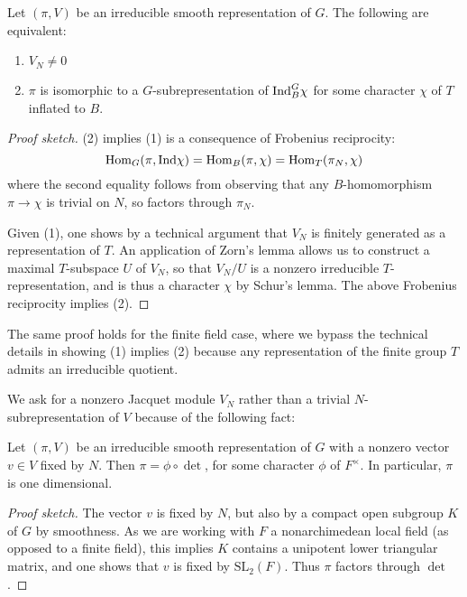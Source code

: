 \begin{prop}
    Let $(\pi,V)$ be an irreducible smooth representation of $G$. The following are equivalent:
    \begin{enumerate}
        \item $V_N \neq 0$
        \item $\pi$ is isomorphic to a $G$-subrepresentation of $\mathrm{Ind}_B^G \chi$ for some character $\chi$ of $T$ inflated to $B$.
    \end{enumerate}
\end{prop}
\begin{proof}[Proof sketch]
    (2) implies (1) is a consequence of Frobenius reciprocity:
    $$\mathrm{Hom}_G(\pi,\mathrm{Ind} \chi) = \mathrm{Hom}_B(\pi, \chi) = \mathrm{Hom}_T(\pi_N,\chi)$$ where the second equality follows from observing that any $B$-homomorphism $\pi \to \chi$ is trivial on $N$, so factors through $\pi_N$.

    Given (1), one shows by a technical argument that $V_N$ is finitely generated as a representation of $T$. An application of Zorn's lemma allows us to construct a maximal $T$-subspace $U$ of $V_N$, so that $V_N/U$ is a nonzero irreducible $T$-representation, and is thus a character $\chi$ by Schur's lemma. The above Frobenius reciprocity implies (2).
\end{proof}

\begin{rem}
    The same proof holds for the finite field case, where we bypass the technical details in showing (1) implies (2) because any representation of the finite group $T$ admits an irreducible quotient.
\end{rem}

\begin{rem}
    We ask for a nonzero Jacquet module $V_N$ rather than a trivial $N$-subrepresentation of $V$ because of the following fact:
\end{rem}

\begin{lemma}
    Let $(\pi,V)$ be an irreducible smooth representation of $G$ with a nonzero vector $v\in V$ fixed by $N$. Then $\pi = \phi \circ \det$, for some character $\phi$ of $F^\times$. In particular, $\pi$ is one dimensional.
\end{lemma}
\begin{proof}[Proof sketch]
    The vector $v$ is fixed by $N$, but also by a compact open subgroup $K$ of $G$ by smoothness. As we are working with $F$ a nonarchimedean local field (as opposed to a finite field), this implies $K$ contains a unipotent lower triangular matrix, and one shows that $v$ is fixed by $\mathrm{SL}_2(F)$. Thus $\pi$ factors through $\det$.
\end{proof}


